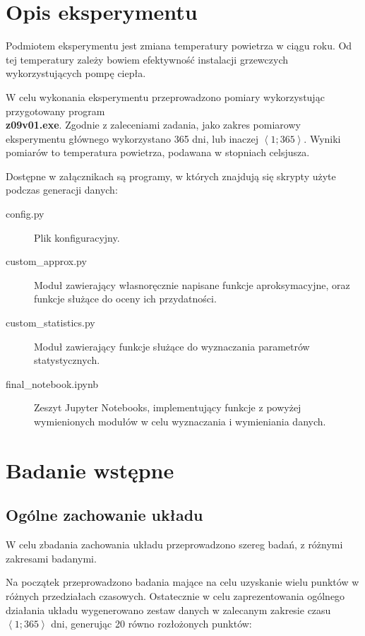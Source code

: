 \documentclass[a4paper, 12pt]{mwart}
\begin{document}
	\section{Opis eksperymentu}
		Podmiotem eksperymentu jest zmiana temperatury powietrza w ciągu roku. Od tej
		temperatury zależy bowiem efektywność instalacji grzewczych wykorzystujących
		pompę ciepła.

		W celu wykonania eksperymentu przeprowadzono pomiary wykorzystując przygotowany
		program\\ \textbf{z09v01.exe}. Zgodnie z zaleceniami zadania, jako zakres pomiarowy
		eksperymentu głównego wykorzystano 365 dni, lub inaczej $ \left\langle 1;365 
		\right\rangle$. Wyniki pomiarów to temperatura powietrza, podawana w stopniach celsjusza.

		Dostępne w załącznikach są programy, w których znajdują się skrypty użyte podczas generacji
		danych:
		\begin{description}
			\item[config.py] Plik konfiguracyjny.
			\item[custom\_approx.py] Moduł zawierający własnoręcznie napisane funkcje aproksymacyjne,
				oraz funkcje służące do oceny ich przydatności.
			\item[custom\_statistics.py] Moduł zawierający funkcje służące do wyznaczania parametrów statystycznych.
			\item[final\_notebook.ipynb] Zeszyt Jupyter Notebooks, implementujący funkcje z powyżej wymienionych modułów
				w celu wyznaczania i wymieniania danych. 
		\end{description}

	\section{Badanie wstępne}
		\subsection{Ogólne zachowanie układu}
			W celu zbadania zachowania układu przeprowadzono szereg badań, z różnymi zakresami badanymi.

			Na początek przeprowadzono badania mające na celu uzyskanie wielu punktów w różnych 
			przedziałach czasowych. Ostatecznie w celu zaprezentowania ogólnego działania układu 
			wygenerowano zestaw danych w zalecanym zakresie czasu $\left< 1;365 \right>$ dni, 
			generując 20 równo rozłożonych punktów:
\end{document}
